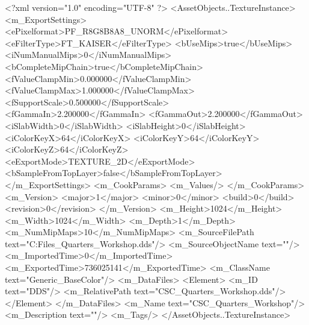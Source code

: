 <?xml version="1.0" encoding="UTF-8" ?>
<AssetObjects..TextureInstance>
	<m_ExportSettings>
		<ePixelformat>PF_R8G8B8A8_UNORM</ePixelformat>
		<eFilterType>FT_KAISER</eFilterType>
		<bUseMips>true</bUseMips>
		<iNumManualMips>0</iNumManualMips>
		<bCompleteMipChain>true</bCompleteMipChain>
		<fValueClampMin>0.000000</fValueClampMin>
		<fValueClampMax>1.000000</fValueClampMax>
		<fSupportScale>0.500000</fSupportScale>
		<fGammaIn>2.200000</fGammaIn>
		<fGammaOut>2.200000</fGammaOut>
		<iSlabWidth>0</iSlabWidth>
		<iSlabHeight>0</iSlabHeight>
		<iColorKeyX>64</iColorKeyX>
		<iColorKeyY>64</iColorKeyY>
		<iColorKeyZ>64</iColorKeyZ>
		<eExportMode>TEXTURE_2D</eExportMode>
		<bSampleFromTopLayer>false</bSampleFromTopLayer>
	</m_ExportSettings>
	<m_CookParams>
		<m_Values/>
	</m_CookParams>
	<m_Version>
		<major>1</major>
		<minor>0</minor>
		<build>0</build>
		<revision>0</revision>
	</m_Version>
	<m_Height>1024</m_Height>
	<m_Width>1024</m_Width>
	<m_Depth>1</m_Depth>
	<m_NumMipMaps>10</m_NumMipMaps>
	<m_SourceFilePath text="C:\Users\Shadow\Desktop\Working Files\Textures\CSC_Quarters_Workshop.dds"/>
	<m_SourceObjectName text=""/>
	<m_ImportedTime>0</m_ImportedTime>
	<m_ExportedTime>736025141</m_ExportedTime>
	<m_ClassName text="Generic_BaseColor"/>
	<m_DataFiles>
		<Element>
			<m_ID text="DDS"/>
			<m_RelativePath text="CSC_Quarters_Workshop.dds"/>
		</Element>
	</m_DataFiles>
	<m_Name text="CSC_Quarters_Workshop"/>
	<m_Description text=""/>
	<m_Tags/>
</AssetObjects..TextureInstance>

